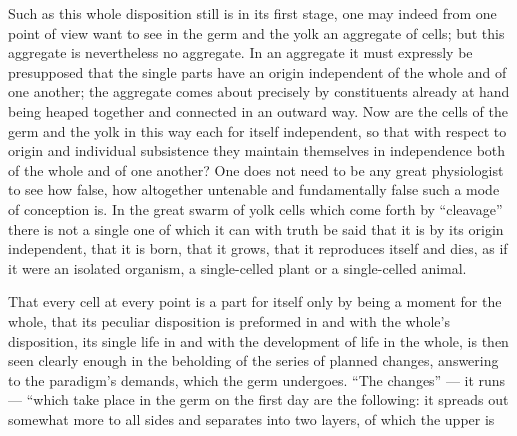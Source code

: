 \documentclass[12pt,a4paper]{book}
\begin{document}
Such as this whole disposition still is in its first stage, one may indeed from one
point of view want to see in the germ and the yolk an aggregate of cells; but this
aggregate is nevertheless no aggregate. In an aggregate it must expressly be
presupposed that the single parts have an origin independent of the whole and of
one another; the aggregate comes about precisely by constituents already at hand
being heaped together and connected in an outward way. Now are the cells of the
germ and the yolk in this way each for itself independent, so that with respect to
origin and individual subsistence they maintain themselves in independence both of
the whole and of one another? One does not need to be any great physiologist to see
how false, how altogether untenable and fundamentally false such a mode of
conception is. In the great swarm of yolk cells which come forth by ``cleavage''
there is not a single one of which it can with truth be said that it is by its
origin independent, that it is born, that it grows, that it reproduces itself and
dies, as if it were an isolated organism, a single-celled plant or a single-celled
animal.

That every cell at every point is a part for itself only by being a moment for the
whole, that its peculiar disposition is preformed in and with the whole's
disposition, its single life in and with the development of life in the whole, is
then seen clearly enough in the beholding of the series of planned changes,
answering to the paradigm's demands, which the germ undergoes. ``The changes'' ---
it runs --- ``which take place in the germ on the first day are the following: it
spreads out somewhat more to all sides and separates into two layers, of which the
upper is
\end{document}
